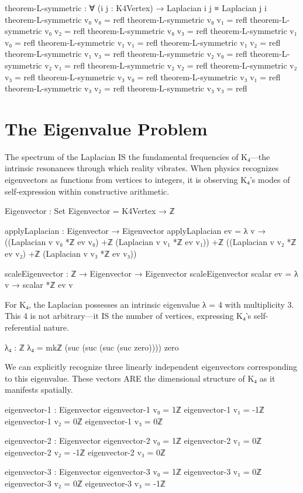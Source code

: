 \documentclass[11pt,a4paper]{book}
\begin{document}
\begin{code}
theorem-L-symmetric : ∀ (i j : K4Vertex) → Laplacian i j ≡ Laplacian j i
theorem-L-symmetric v₀ v₀ = refl
theorem-L-symmetric v₀ v₁ = refl
theorem-L-symmetric v₀ v₂ = refl
theorem-L-symmetric v₀ v₃ = refl
theorem-L-symmetric v₁ v₀ = refl
theorem-L-symmetric v₁ v₁ = refl
theorem-L-symmetric v₁ v₂ = refl
theorem-L-symmetric v₁ v₃ = refl
theorem-L-symmetric v₂ v₀ = refl
theorem-L-symmetric v₂ v₁ = refl
theorem-L-symmetric v₂ v₂ = refl
theorem-L-symmetric v₂ v₃ = refl
theorem-L-symmetric v₃ v₀ = refl
theorem-L-symmetric v₃ v₁ = refl
theorem-L-symmetric v₃ v₂ = refl
theorem-L-symmetric v₃ v₃ = refl
\end{code}

\section{The Eigenvalue Problem}

The spectrum of the Laplacian IS the fundamental frequencies of K₄—the intrinsic resonances through which reality vibrates. When physics recognizes eigenvectors as functions from vertices to integers, it is observing K₄'s modes of self-expression within constructive arithmetic.

\begin{code}
Eigenvector : Set
Eigenvector = K4Vertex → ℤ

applyLaplacian : Eigenvector → Eigenvector
applyLaplacian ev = λ v → 
  ((Laplacian v v₀ *ℤ ev v₀) +ℤ (Laplacian v v₁ *ℤ ev v₁)) +ℤ 
  ((Laplacian v v₂ *ℤ ev v₂) +ℤ (Laplacian v v₃ *ℤ ev v₃))

scaleEigenvector : ℤ → Eigenvector → Eigenvector
scaleEigenvector scalar ev = λ v → scalar *ℤ ev v
\end{code}

For K₄, the Laplacian possesses an intrinsic eigenvalue λ = 4 with multiplicity 3. This 4 is not arbitrary—it IS the number of vertices, expressing K₄'s self-referential nature.

\begin{code}
λ₄ : ℤ
λ₄ = mkℤ (suc (suc (suc (suc zero)))) zero

\end{code}

We can explicitly recognize three linearly independent eigenvectors corresponding to this eigenvalue. These vectors ARE the dimensional structure of K₄ as it manifests spatially.

\begin{code}
eigenvector-1 : Eigenvector
eigenvector-1 v₀ = 1ℤ
eigenvector-1 v₁ = -1ℤ
eigenvector-1 v₂ = 0ℤ
eigenvector-1 v₃ = 0ℤ

eigenvector-2 : Eigenvector
eigenvector-2 v₀ = 1ℤ
eigenvector-2 v₁ = 0ℤ
eigenvector-2 v₂ = -1ℤ
eigenvector-2 v₃ = 0ℤ

eigenvector-3 : Eigenvector
eigenvector-3 v₀ = 1ℤ
eigenvector-3 v₁ = 0ℤ
eigenvector-3 v₂ = 0ℤ
eigenvector-3 v₃ = -1ℤ
\end{code}
\end{document}
